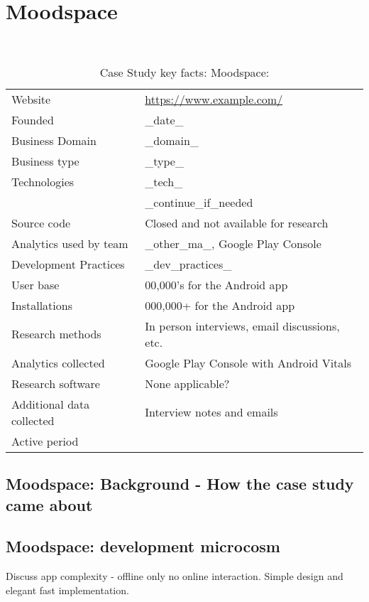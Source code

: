 \section{Moodspace}~\label{study-moodspace}

{\renewcommand{\arraystretch}{0.8}%
\begin{table}[htbp!]
    \centering
    \small
    \setlength{\tabcolsep}{1pt}
    \begin{tabular}{ll}
       \toprule
       Website &\url{https://www.example.com/} \\
       Founded & _date_ \\
       Business Domain & _domain_ \\
       Business type & _type_ \\
       Technologies  & _tech_ \\
       & _continue_if_needed \\
       Source code  &Closed and not available for research \\
       Analytics used by team & _other_ma_, Google Play Console \\
       Development Practices & _dev_practices_ \\
       \midrule
       User base & 00,000's for the Android app \\
       Installations & 000,000+ for the Android app \\
       \midrule
       Research methods &In person interviews, email discussions, etc. \\
       Analytics collected &Google Play Console with Android Vitals \\
       Research software & None applicable? \\
       Additional data collected &Interview notes and emails \\
       Active period & \\
       \bottomrule
    \end{tabular}
    \caption{Case Study key facts: Moodspace:}
    \label{tab:blank_case_study_anaytics_overview}
\end{table}
}

\subsection{Moodspace: Background - How the case study came about}

\subsection{Moodspace: development microcosm}
Discuss app complexity - offline only no online interaction. Simple design and elegant fast implementation.

